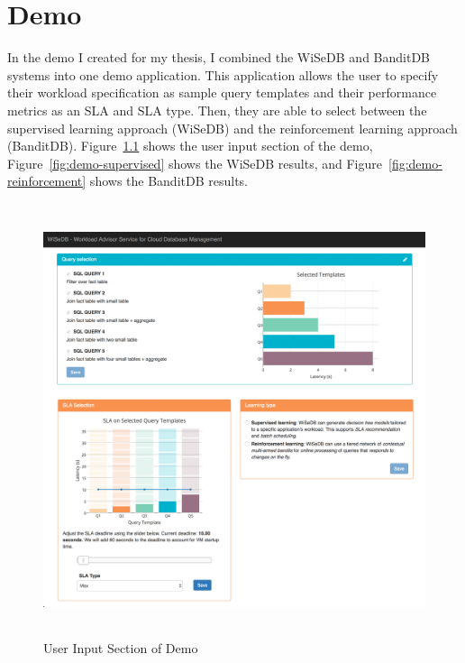 \documentclass{brandiss}
\numberwithin{section}{chapter}
\numberwithin{figure}{chapter}
\theoremstyle{definition}
\theoremstyle{plain}
\theoremstyle{remark}
\begin{document}
\chapter{Demo}

In the demo I created for my thesis, I combined the WiSeDB and BanditDB systems into one demo application. This application allows the user to specify their workload specification as sample query templates and their performance metrics as an SLA and SLA type. Then, they are able to select between the supervised learning approach (WiSeDB) and the reinforcement learning approach (BanditDB). Figure~\ref{fig:demo-screenshot} shows the user input section of the demo, Figure~\ref{fig:demo-supervised} shows the WiSeDB results, and Figure~\ref{fig:demo-reinforcement} shows the BanditDB results.

\begin{figure}[htbp]
  \centering
  \includegraphics[height=5in]{demo-screenshot}
  \caption{User Input Section of Demo}
  \label{fig:demo-screenshot}
\end{figure}
\end{document}
